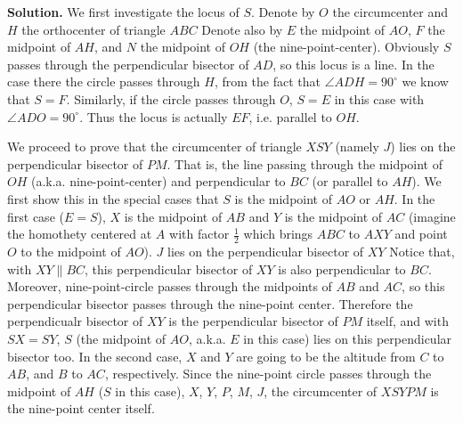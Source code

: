 \documentclass[11pt,a4paper]{article}
\begin{document}
\begin{itemize}

\textbf{Solution.}
We first investigate the locus of $S$. 
Denote by $O$ the circumcenter and $H$ the orthocenter of triangle $ABC$
Denote also by $E$ the midpoint of $AO$, $F$ the midpoint of $AH$, and $N$ the midpoint of $OH$ (the nine-point-center). 
Obviously $S$ passes through the perpendicular bisector of $AD$, so this locus is a line. 
In the case there the circle passes through $H$, from the fact that $\angle ADH=90^{\circ}$ we know that $S=F$.
Similarly, if the circle passes through $O$, $S=E$ in this case with $\angle ADO=90^{\circ}$. 
Thus the locus is actually $EF$, i.e. parallel to $OH$. 

We proceed to prove that the circumcenter of triangle $XSY$ (namely $J$) lies on the perpendicular bisector of $PM$. 
That is, the line passing through the midpoint of $OH$ (a.k.a. nine-point-center) and perpendicular to $BC$ (or parallel to $AH$). 
We first show this in the special cases that $S$ is the midpoint of $AO$ or $AH$. 
In the first case ($E=S$), $X$ is the midpoint of $AB$ and $Y$ is the midpoint of $AC$ (imagine the homothety centered at $A$ with factor $\frac 12$ which brings $ABC$ to $AXY$ and point $O$ to the midpoint of $AO$). 
$J$ lies on the perpendicular bisector of $XY$
Notice that, with $XY\parallel BC$, this perpendicular bisector of $XY$ is also perpendicular to $BC$. 
Moreover, nine-point-circle passes through the midpoints of $AB$ and $AC$, so this perpendicular bisector passes through the nine-point center. 
Therefore the perpendicualr bisector of $XY$ is the perpendicular bisector of $PM$ itself, 
and with $SX=SY$, $S$ (the midpoint of $AO$, a.k.a. $E$ in this case) lies on this perpendicular bisector too. 
In the second case, $X$ and $Y$ are going to be the altitude from $C$ to $AB$, and $B$ to $AC$, respectively. 
Since the nine-point circle passes through the midpoint of $AH$ ($S$ in this case), $X$, $Y$, $P$, $M$, 
$J$, the circumcenter of $XSYPM$ is the nine-point center itself. 


\end{itemize}
\end{document}
